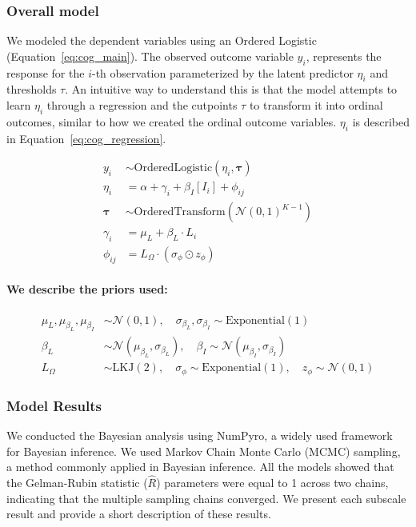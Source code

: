 \subsubsection{Overall model}
We modeled the dependent variables using an Ordered Logistic (Equation~\ref{eq:cog_main}). The observed outcome variable $y_i$, represents the response for the $i$-th observation parameterized by the latent predictor $\eta_i$ and thresholds $\tau$. An intuitive way to understand this is that the model attempts to learn $\eta_i$ through a regression and the cutpoints $\tau$ to transform it into ordinal outcomes, similar to how we created the ordinal outcome variables. $\eta_i$ is described in Equation~\ref{eq:cog_regression}.


\begin{align}
    y_i &\sim \text{OrderedLogistic}(\eta_i, \boldsymbol{\tau}) \label{eq:cog_main}\\
    \eta_i &= \alpha + \gamma_i + \beta_I[I_i] + \phi_{ij} \label{eq:cog_regression}\\
    \boldsymbol{\tau} &\sim \text{OrderedTransform}(\mathcal{N}(0, 1)^{K-1}) \\
    \gamma_i &= \mu_L + \beta_L \cdot L_i \label{eq:cog_ordinal} \\
    \phi_{ij} &= L_{\Omega} \cdot (\sigma_{\phi} \odot z_{\phi}) \label{eq:cog_lkj}
\end{align}


\paragraph{We describe the priors used:}
\begin{align}
    \mu_{L}, \mu_{\beta_L}, \mu_{\beta_I} &\sim \mathcal{N}(0, 1), \quad \sigma_{\beta_L}, \sigma_{\beta_I} \sim \text{Exponential}(1) \label{eq:cog_prior_1} \\
    \beta_L &\sim \mathcal{N}(\mu_{\beta_L}, \sigma_{\beta_L}), \quad \beta_I \sim \mathcal{N}(\mu_{\beta_I}, \sigma_{\beta_I}) \label{eq:cog_prior_2} \\
    L_{\Omega} &\sim \text{LKJ}(2), \quad \sigma_{\phi} \sim \text{Exponential}(1), \quad z_{\phi} \sim \mathcal{N}(0, 1) \label{eq:cog_prior_3} 
\end{align}

\subsubsection{Model Results}
We conducted the Bayesian analysis using NumPyro, a widely used framework for Bayesian inference. We used Markov Chain Monte Carlo (MCMC) sampling, a method commonly applied in Bayesian inference. All the models showed that the Gelman-Rubin statistic ($\hat{R}$) parameters were equal to 1 across two chains, indicating that the multiple sampling chains converged. We present each subscale result and provide a short description of these results.

